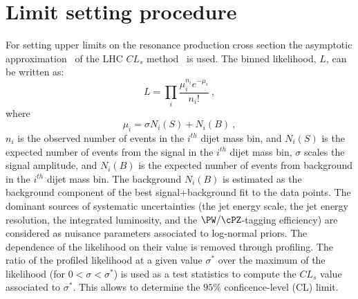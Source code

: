\newpage
\section{Limit setting procedure}
\label{sec:statistics}

For setting upper limits on the resonance production cross section
the asymptotic approximation~\cite{AsymptCLs} of the LHC $CL_s$ method~\cite{CLs1,CLs2} is used.
The binned likelihood, $L$, can be written as:
\begin{equation}
L = \prod_{i} \frac{\mu_{i}^{n_{i}} e^{-\mu_{i}}}{n_{i}!} \ ,
\end{equation}
where
\begin{equation}
{\mu_{i}} = {\sigma}{N_{i}(S)} + {N_{i}(B)} \ ,
\label{function}
\end{equation}
$n_i$ is the observed number of events in the $i^{th}$ dijet mass bin, and
$N_i(S)$ is the expected number of events from the signal in the $i^{th}$ dijet
mass bin, $\sigma$ scales the signal amplitude, and
$N_i(B)$ is the expected number of events from background in the
$i^{th}$ dijet mass bin.
The background $N_i(B)$ is estimated as the background component
of the best signal+background fit to the data points.
The dominant sources of systematic uncertainties (the jet energy
scale, the jet energy resolution, the integrated luminosity, and the
$\PW/\cPZ$-tagging efficiency) are considered as nuisance parameters associated to log-normal priors.
The dependence of the likelihood on their
value is removed through profiling. The ratio of the profiled
likelihood at a given value $\sigma^*$ over the maximum of the
likelihood (for $0<\sigma<\sigma^*$) is used as a test statistics
to compute the $CL_s$ value associated to $\sigma^*$. This allows to
determine the $95\%$ conficence-level (CL) limit.
